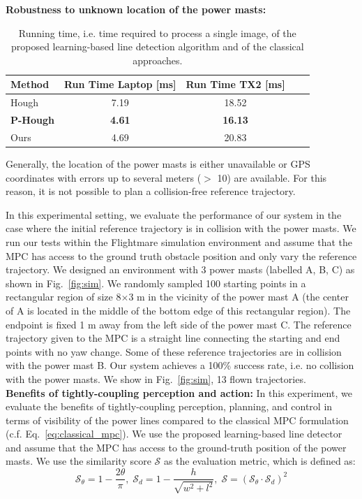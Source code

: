 
\noindent
\textbf{Robustness to unknown location of the power masts: }
\begin{table}[t!]
	\centering
	\begin{tabular}{lcccl}
		\toprule
		\textbf{Method}  & \textbf{Run Time Laptop [ms]} & \textbf{Run Time TX2 [ms]} \\
		\midrule
		Hough &7.19&18.52\\
        \textbf{P-Hough}  &\textbf{4.61}&\textbf{16.13}  \\
		\midrule
		Ours& 4.69& 20.83\\ 
		\bottomrule
	\end{tabular}
    \vspace{1ex}
	\caption{Running time, i.e. time required to process a single image, of the proposed learning-based line detection algorithm and of the classical approaches.}
    \vspace{-3.5ex}
	\label{tab:trad_methods}
\end{table}
Generally, the location of the power masts is either unavailable or GPS coordinates with errors up to several meters ($>$ 10) are available. For this reason, it is not possible to plan a collision-free reference trajectory.

In this experimental setting, we evaluate the performance of our system in the case where the initial reference trajectory is in collision with the power masts. We run our tests within the Flightmare simulation environment and assume that the MPC has access to the ground truth obstacle position and only vary the reference trajectory. We designed an environment with 3 power masts (labelled A, B, C) as shown in Fig.~\ref{fig:sim}. We randomly sampled 100 starting points in a rectangular region of size 8$\times$3 m in the vicinity of the power mast A (the center of A is located in the middle of the bottom edge of this rectangular region). The endpoint is fixed 1 m away from the left side of the power mast C. The reference trajectory given to the MPC is a straight line connecting the starting and end points with no yaw change. Some of these reference trajectories are in collision with the power mast B. Our system achieves a 100\% success rate, i.e. no collision with the power masts.
We show in Fig.~\ref{fig:sim}, 13 flown trajectories.\\

\noindent
\textbf{Benefits of tightly-coupling perception and action:}
In this experiment, we evaluate the benefits of tightly-coupling perception, planning, and control in terms of visibility of the power lines compared to the classical MPC formulation (c.f. Eq.~\ref{eq:classical_mpc}). We use the proposed learning-based line detector and assume that the MPC has access to the ground-truth position of the power masts. We use the similarity score $\mathcal{S}$ as the evaluation metric, which is defined as:
\begin{equation}
	\mathcal{S}_\theta = 1- \frac{2\theta}{\pi},\;
	\mathcal{S}_d = 1 - \frac{h}{\sqrt{w^2 + l^2}},\;
	\mathcal{S} = (\mathcal{S}_\theta \cdot \mathcal{S}_d)^2
 \label{eq:sim_score}
\end{equation}
%
%
%

